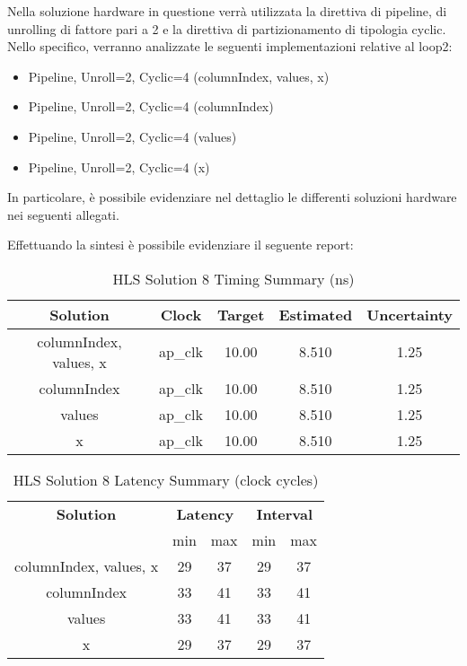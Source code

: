 Nella soluzione hardware in questione verrà utilizzata la direttiva di pipeline, di unrolling di fattore pari a 2 e la direttiva di partizionamento di tipologia cyclic. Nello specifico, verranno analizzate le seguenti implementazioni relative al loop2:
\begin{itemize}
	\item Pipeline, Unroll=2, Cyclic=4 (columnIndex, values, x)
	\item Pipeline, Unroll=2, Cyclic=4 (columnIndex)
	\item Pipeline, Unroll=2, Cyclic=4 (values)
	\item Pipeline, Unroll=2, Cyclic=4 (x)
\end{itemize}

In particolare, è possibile evidenziare nel dettaglio le differenti soluzioni hardware nei seguenti allegati.





Effettuando la sintesi è possibile evidenziare il seguente report:\\

\begin{table}[H]
	\centering
	\begin{tabular}{|c|c|c|c|c|}
		\hline
		\textbf{Solution} & \textbf{Clock} & \textbf{Target} & \textbf{Estimated} & \textbf{Uncertainty} \\
		\hline
		columnIndex, values, x & ap\_clk & 10.00 & 8.510 & 1.25 \\
		\hline
		columnIndex & ap\_clk & 10.00 & 8.510 & 1.25 \\
		\hline
		values & ap\_clk & 10.00 & 8.510 & 1.25 \\
		\hline
		x & ap\_clk & 10.00 & 8.510 & 1.25 \\
		\hline
	\end{tabular}
	\caption{HLS Solution 8 Timing Summary (ns)}
	\label{tab:hls-solution-8-timing-summary}
\end{table}

\begin{table}[H]
	\centering
	\begin{tabular}{|c|c|c|c|c|}
		\hline
		\multicolumn{1}{|c|}{\textbf{Solution}} & \multicolumn{2}{|c|}{\textbf{Latency}} & \multicolumn{2}{|c|}{\textbf{Interval}} \\
		& min & max & min & max \\
		\hline
		columnIndex, values, x & 29 & 37 & 29 & 37 \\
		\hline
		columnIndex & 33 & 41 & 33 & 41 \\
		\hline
		values & 33 & 41 & 33 & 41 \\
		\hline
		x & 29 & 37 & 29 & 37 \\
		\hline
	\end{tabular}
	\caption{HLS Solution 8 Latency Summary (clock cycles)}
	\label{tab:hls-solution-8-latency-summary}
\end{table}

